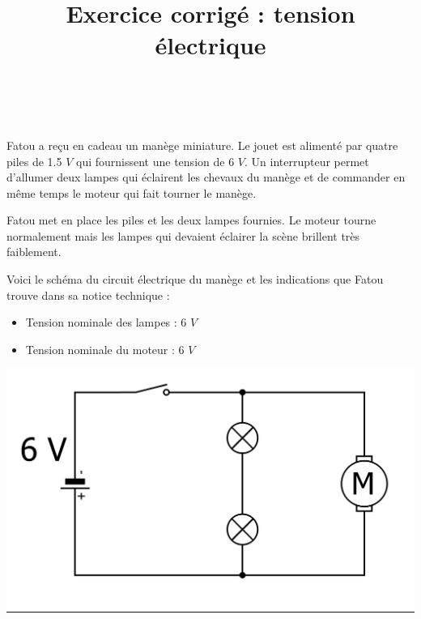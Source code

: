 \documentclass[a4paper,11pt]{exam}
\author{\ }
\date{}
\title{Exercice corrigé : tension électrique}
\makeatletter
\def\maketitle{{\centering%
		\par{\huge\textbf{\@title}}%
		\par{\@date}%
		\par}}
\makeatother
\begin{document}
%	

	\maketitle
	
\vspace*{1cm}

Fatou a reçu en cadeau un manège miniature. Le jouet est alimenté par quatre piles de \num{1.5} $V$ qui fournissent une tension de 6 $V$. Un interrupteur permet d'allumer deux lampes qui éclairent les chevaux du manège et de commander en même temps le moteur qui fait tourner le manège.


Fatou met en place les piles et les deux lampes fournies. Le moteur tourne normalement mais les lampes qui devaient éclairer la scène brillent très faiblement.

Voici le schéma du circuit électrique du manège et les indications que Fatou trouve dans sa notice technique :

\begin{multicols}{2}
	\begin{itemize}
		\item Tension nominale des lampes : 6 $V$
		\item Tension nominale du moteur : 6 $V$
	\end{itemize}

	\begin{center}
		\includegraphics[scale=0.3]{1_schema}
	\end{center}
\end{multicols}
\end{document}
